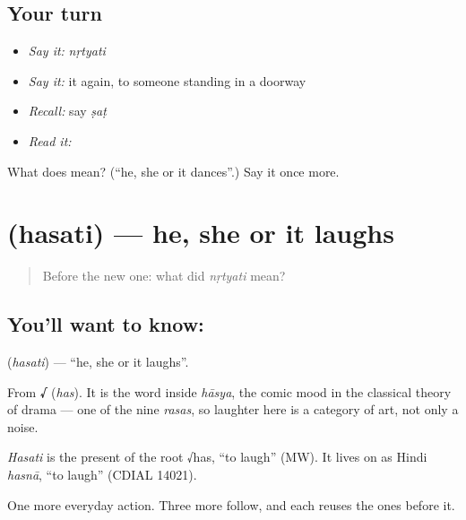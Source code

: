 \subsection*{Your turn}
\begin{itemize}
\raggedright
  \item \emph{Say it:} \emph{nṛtyati}
  \item \emph{Say it:} it again, to someone standing in a doorway
  \item \emph{Recall:} say \emph{ṣaṭ}
  \item \emph{Read it:} \textbf{}
\end{itemize}

\begin{tcolorbox}[breakable,colback=teal!4,colframe=teal!35!black,title={Before you move on}]
What does  mean? (\textquotedblleft{}he, she or it dances\textquotedblright{}.) Say it once more.
\end{tcolorbox}
\section[\texorpdfstring{\sk{हसति} (hasati)}{हसति (hasati)}]{ (hasati) — he, she or it laughs}

\label{lesson:SA-C21-laugh}



\begin{quote}
Before the new one: what did \emph{nṛtyati} mean?
\end{quote}

\subsection*{You'll want to know: }
\textbf{} (\emph{hasati}) — \textquotedblleft{}he, she or it laughs\textquotedblright{}.

From \textbf{√} (\emph{has}). It is the word inside \emph{hāsya}, the comic mood in the classical theory of drama — one of the nine \emph{rasas}, so laughter here is a category of art, not only a noise.

\begin{cousinweb}
\emph{Hasati} is the present of the root √has, \textquotedblleft{}to laugh\textquotedblright{} (MW). It lives on as Hindi \emph{hasnā}, \textquotedblleft{}to laugh\textquotedblright{} (CDIAL 14021).
\end{cousinweb}

\begin{grammarlens}[title={What you've built}]
One more everyday action. Three more follow, and each reuses the ones before it.
\end{grammarlens}

